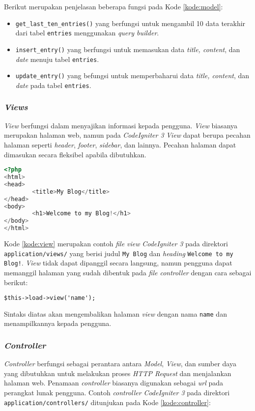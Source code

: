 Berikut merupakan penjelasan beberapa fungsi pada Kode \ref{kode:model}:
\begin{itemize}
\item \verb|get_last_ten_entries()| yang berfungsi untuk mengambil 10 data terakhir dari tabel \verb|entries| menggunakan \textit{query builder}.
\item \verb|insert_entry()| yang berfungsi untuk memasukan data \textit{title, content}, dan \textit{date} menuju tabel \verb|entries|.
\item \verb|update_entry()| yang befungsi untuk memperbaharui data \textit{title, content}, dan \textit{date} pada tabel \verb|entries|.
\end{itemize}

\subsubsection{\textit{\textbf{Views}}}
\textit{View} berfungsi dalam menyajikan informasi kepada pengguna. \textit{View} biasanya merupakan halaman web, namun pada \textit{CodeIgniter 3} \textit{View} dapat berupa pecahan halaman seperti \textit{header}, \textit{footer}, \textit{sidebar}, dan lainnya. Pecahan halaman dapat dimasukan secara fleksibel apabila dibutuhkan.

\begin{lstlisting}[language=PHP, caption=Contoh \textit{view} pada \textit{CodeIgniter 3}, label=kode:view]
<?php
<html>
<head>
        <title>My Blog</title>
</head>
<body>
        <h1>Welcome to my Blog!</h1>
</body>
</html>
\end{lstlisting}

Kode \ref{kode:view} merupakan contoh \textit{file view} \textit{CodeIgniter 3} pada direktori \verb|application/views/| yang berisi judul \texttt{My Blog} dan \textit{heading} \texttt{Welcome to my Blog!}. \textit{View} tidak dapat dipanggil secara langsung, namun pengguna dapat memanggil halaman yang sudah dibentuk pada \textit{file controller} dengan cara sebagai berikut:

\begin{center}
\verb|$this->load->view('name');|
\end{center}

Sintaks diatas akan mengembalikan halaman \textit{view} dengan nama \texttt{name} dan menampilkannya kepada pengguna.

\subsubsection{\textit{\textbf{Controller}}} 
\textit{Controller} berfungsi sebagai perantara antara \textit{Model}, \textit{View}, dan sumber daya yang dibutuhkan untuk melakukan proses \textit{HTTP Request} dan menjalankan halaman web. Penamaan \textit{controller} biasanya digunakan sebagai \textit{url} pada perangkat lunak pengguna. Contoh \textit{controller} \textit{CodeIgniter 3} pada direktori \verb|application/controllers/| ditunjukan pada Kode \ref{kode:controller}:

